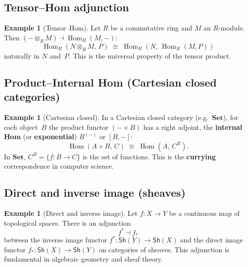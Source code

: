 \documentclass[a4paper,12pt]{book}
\DeclareMathOperator{\Hom}{Hom}
\newcommand{\Set}{\mathbf{Set}}
\theoremstyle{definition}
\newtheorem{example}[definition]{Example}
\theoremstyle{plain}
\theoremstyle{remark}
\begin{document}
\subsection{Tensor--Hom adjunction}

\begin{example}[Tensor--Hom]\label{ex:tensor-hom}
Let $R$ be a commutative ring and $M$ an $R$-module.
Then $(-\otimes_R M) \dashv \Hom_R(M,-)$:
\[
    \Hom_R(N\otimes_R M,\, P) \;\cong\; \Hom_R(N,\,\Hom_R(M,P))
\]
naturally in $N$ and~$P$.  This is the universal property of the
tensor product.
\end{example}

\subsection{Product--Internal Hom (Cartesian closed categories)}

\begin{example}[Cartesian closed]\label{ex:cartesian-closed}
In a Cartesian closed category (e.g.\ $\Set$), for each object~$B$
the product functor $(-\times B)$ has a right adjoint, the
\textbf{internal Hom} (or \textbf{exponential}) $B^{(-)}$ or $[B,-]$:
\[
    \Hom(A\times B,\,C) \;\cong\; \Hom(A,\,C^B).
\]
In $\Set$, $C^B = \{f\colon B\to C\}$ is the set of functions.
This is the \textbf{currying} correspondence in computer science.
\end{example}

\subsection{Direct and inverse image (sheaves)}

\begin{example}[Direct and inverse image]\label{ex:sheaf-adjunction}
Let $f\colon X\to Y$ be a continuous map of topological spaces.
There is an adjunction
\[
    f^* \dashv f_*
\]
between the inverse image functor $f^*\colon\mathsf{Sh}(Y)\to\mathsf{Sh}(X)$
and the direct image functor $f_*\colon\mathsf{Sh}(X)\to\mathsf{Sh}(Y)$
on categories of sheaves.  This adjunction is fundamental in algebraic
geometry and sheaf theory.
\end{example}
\end{document}
